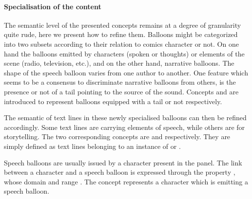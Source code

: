 
\paragraph{Specialisation of the content} %
\label{par:specialisation_of_the_content}

The semantic level of the presented concepts remains at a degree of granularity quite rude, here we present how to refine them.
Balloons might be categorized into two subsets according to their relation to comics character or not.
On one hand the balloons emitted by characters (spoken or thoughts) or elements of the scene (radio, television, etc.), and on the other hand, narrative balloons.
The shape of the speech balloon varies from one author to another.
One feature which seems to be a consensus to discriminate narrative balloons from others, is the presence or not of a tail pointing to the source of the sound.
Concepts  and  are introduced to represent balloons equipped with a tail or not respectively.

The semantic of text lines in these newly specialised balloons can then be refined accordingly.
Some text lines are carrying elements of speech, while others are for storytelling.
The two corresponding concepts are  and  respectively.
They are simply defined as text lines belonging to an instance of  or .

Speech balloons are usually issued by a character present in the panel.
The link between a character and a speech balloon is expressed through the property , whose domain  and range .
The concept  represents a character which is emitting a speech balloon.


